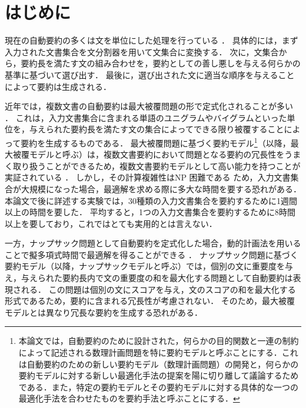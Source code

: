 \documentclass[japanese]{jnlp_1.4}
\begin{document}
\maketitle


\section{はじめに}

現在の自動要約の多くは文を単位にした処理を行っている \cite{okumura05}．
具体的には，まず入力された文書集合を文分割器を用いて文集合に変換する．
次に，文集合から，要約長を満たす文の組み合わせを，要約としての善し悪しを与える何らかの基準に基づいて選び出す．
最後に，選び出された文に適当な順序を与えることによって要約は生成される．

近年では，複数文書の自動要約は最大被覆問題の形で定式化されることが多い \cite{filatova04,yih07,takamura08,gillick09,higashinaka10b,nishikawa13}．
これは，入力文書集合に含まれる単語のユニグラムやバイグラムといった単位を，与えられた要約長を満たす文の集合によってできる限り被覆することによって要約を生成するものである．
最大被覆問題に基づく要約モデル\footnote{本論文では，自動要約のために設計された，何らかの目的関数と一連の制約によって記述される数理計画問題を特に要約モデルと呼ぶことにする．これは自動要約のための新しい要約モデル（数理計画問題）の開発と，何らかの要約モデルに対する新しい最適化手法の提案を陽に切り離して議論するためである．また，特定の要約モデルとその要約モデルに対する具体的な一つの最適化手法を合わせたものを要約手法と呼ぶことにする．}（以降，最大被覆モデルと呼ぶ）は，複数文書要約において問題となる要約の冗長性をうまく取り扱うことができるため，複数文書要約モデルとして高い能力を持つことが実証されている \cite{takamura08,gillick09}．
しかし，その計算複雑性はNP 困難である \cite{khuller99} ため，入力文書集合が大規模になった場合，最適解を求める際に多大な時間を要する恐れがある．
本論文で後に詳述する実験では，30種類の入力文書集合を要約するために1週間以上の時間を要した．
平均すると，1つの入力文書集合を要約するために8時間以上を要しており，これではとても実用的とは言えない．

一方，ナップサック問題として自動要約を定式化した場合，動的計画法を用いることで擬多項式時間で最適解を得ることができる \cite{korte08,hirao09b}．
ナップサック問題に基づく要約モデル（以降，ナップサックモデルと呼ぶ）では，個別の文に重要度を与え，与えられた要約長内で文の重要度の和を最大化する問題として自動要約は表現される．
この問題は個別の文にスコアを与え，文のスコアの和を最大化する形式であるため，要約に含まれる冗長性が考慮されない．
そのため，最大被覆モデルとは異なり冗長な要約を生成する恐れがある．
\end{document}
